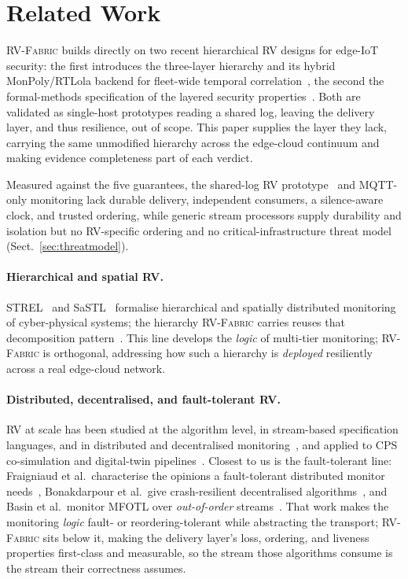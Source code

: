 \documentclass[runningheads]{llncs}
\newcommand{\sys}{\textsc{RV-Fabric}\xspace}
\begin{document}
\section{Related Work}
\label{sec:related}
\sys builds directly on two recent hierarchical RV designs for edge-IoT security: the
first introduces the three-layer hierarchy and its hybrid MonPoly/RTLola backend for
fleet-wide temporal correlation~\cite{ares2026}, the second the formal-methods
specification of the layered security properties~\cite{csr2026}. Both are validated as
single-host prototypes reading a shared log, leaving the delivery layer, and thus
resilience, out of scope. This paper supplies the layer they lack, carrying the same
unmodified hierarchy across the edge-cloud continuum and making evidence completeness
part of each verdict.

Measured against the five guarantees, the shared-log RV
prototype~\cite{ares2026,csr2026} and MQTT-only monitoring lack durable delivery,
independent consumers, a silence-aware clock, and trusted ordering, while generic stream
processors supply durability and isolation but no RV-specific ordering and no
critical-infrastructure threat model (Sect.~\ref{sec:threatmodel}).

\paragraph{Hierarchical and spatial RV.}
STREL~\cite{strel2017} and SaSTL~\cite{sastl2020} formalise hierarchical and spatially
distributed monitoring of cyber-physical systems; the hierarchy \sys carries reuses that
decomposition pattern~\cite{ares2026,csr2026}. This line develops the \emph{logic} of
multi-tier monitoring; \sys is orthogonal, addressing how such a hierarchy is
\emph{deployed} resiliently across a real edge-cloud network.

\paragraph{Distributed, decentralised, and fault-tolerant RV.}
RV at scale has been studied at the algorithm level, in stream-based specification
languages, and in distributed and decentralised
monitoring~\cite{rvsurvey,bauer2012decentralised}, and applied to CPS co-simulation and
digital-twin pipelines~\cite{temperekidis2022fmirv,temperekidis2022dt}. Closest to us is
the fault-tolerant line: Fraigniaud et al.\ characterise the opinions a fault-tolerant
distributed monitor needs~\cite{fraigniaud2014opinions}, Bonakdarpour et al.\ give
crash-resilient decentralised algorithms~\cite{bonakdarpour2016decentralized}, and Basin
et al.\ monitor MFOTL over \emph{out-of-order} streams~\cite{basin2017outoforder}. That
work makes the monitoring \emph{logic} fault- or reordering-tolerant while abstracting the
transport; \sys sits below it, making the delivery layer's loss, ordering, and liveness
properties first-class and measurable, so the stream those algorithms consume is the
stream their correctness assumes.
\end{document}
